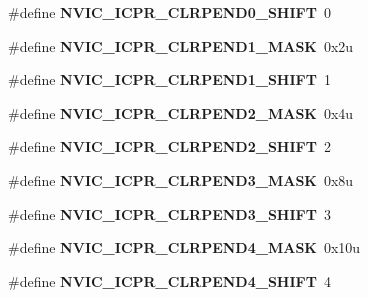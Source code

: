\begin{DoxyCompactItemize}
\#define {\bfseries N\+V\+I\+C\+\_\+\+I\+C\+P\+R\+\_\+\+C\+L\+R\+P\+E\+N\+D0\+\_\+\+S\+H\+I\+FT}~0
\item 
\mbox{\label{group___n_v_i_c___register___masks_gac5401d730a4ab83cd12e39c73fd450a7}} 
\#define {\bfseries N\+V\+I\+C\+\_\+\+I\+C\+P\+R\+\_\+\+C\+L\+R\+P\+E\+N\+D1\+\_\+\+M\+A\+SK}~0x2u
\item 
\mbox{\label{group___n_v_i_c___register___masks_gaaa3b04fcc1513dab45dc6408590f63cc}} 
\#define {\bfseries N\+V\+I\+C\+\_\+\+I\+C\+P\+R\+\_\+\+C\+L\+R\+P\+E\+N\+D1\+\_\+\+S\+H\+I\+FT}~1
\item 
\mbox{\label{group___n_v_i_c___register___masks_gaad12fd31e3b32f03992bb8b8d5d6774e}} 
\#define {\bfseries N\+V\+I\+C\+\_\+\+I\+C\+P\+R\+\_\+\+C\+L\+R\+P\+E\+N\+D2\+\_\+\+M\+A\+SK}~0x4u
\item 
\mbox{\label{group___n_v_i_c___register___masks_ga7ed95a5dfedb8c8e28339041b7783b31}} 
\#define {\bfseries N\+V\+I\+C\+\_\+\+I\+C\+P\+R\+\_\+\+C\+L\+R\+P\+E\+N\+D2\+\_\+\+S\+H\+I\+FT}~2
\item 
\mbox{\label{group___n_v_i_c___register___masks_gaec01eb7138d6ab47f91932de923a2bdd}} 
\#define {\bfseries N\+V\+I\+C\+\_\+\+I\+C\+P\+R\+\_\+\+C\+L\+R\+P\+E\+N\+D3\+\_\+\+M\+A\+SK}~0x8u
\item 
\mbox{\label{group___n_v_i_c___register___masks_ga3760822721ca7d88069f7a81da36f809}} 
\#define {\bfseries N\+V\+I\+C\+\_\+\+I\+C\+P\+R\+\_\+\+C\+L\+R\+P\+E\+N\+D3\+\_\+\+S\+H\+I\+FT}~3
\item 
\mbox{\label{group___n_v_i_c___register___masks_ga9d85cb32c7aca8f89b757cd84d705e9e}} 
\#define {\bfseries N\+V\+I\+C\+\_\+\+I\+C\+P\+R\+\_\+\+C\+L\+R\+P\+E\+N\+D4\+\_\+\+M\+A\+SK}~0x10u
\item 
\mbox{\label{group___n_v_i_c___register___masks_gab2536b9de2f1373a1469d816b8043a6d}} 
\#define {\bfseries N\+V\+I\+C\+\_\+\+I\+C\+P\+R\+\_\+\+C\+L\+R\+P\+E\+N\+D4\+\_\+\+S\+H\+I\+FT}~4

\end{DoxyCompactItemize}
